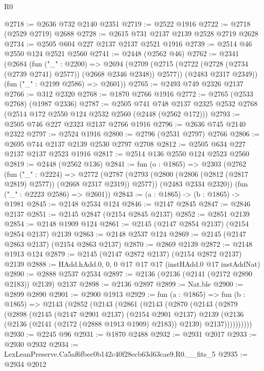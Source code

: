 \begin{lexlean}{R0}
\begin{coremodule}
@2718 := @2636 @732 @2140 @2351
@2719 := @2522 @1916
@2722 := @2718 (@2529 @2719) @2688
@2728 := @2615 @731 @2137 @2139 @2528 @2719 @2628
@2734 := @2505 @604 @227 @2137 @2137 @2521 @1916
@2739 := @2514 @46 @2550 @124 @2521 @2560
@2741 := @2448 (@2562 @46)
@2762 := @2341
    (@2684
      (fun ("_" : @2200) =>
      @2694
        (@2709 (@2715 (@2722 (@2728 (@2734 (@2739 @2741) @2577)) (@2668 @2346 @2348)) @2577))
        (@2483 @2317 @2349))
      (fun ("_" : @2199 @2586) => @2601))
@2765 := @2493 @749 @2326 @2137
@2766 := @312 @2320
@2768 := @1870 @2766 @1916
@2772 := @2765 (@2533 @2768) (@1987 @2336)
@2787 := @2505
    @741
    @748
    @2137
    @2325
    @2532
    @2768
    (@2514 @172 @2550 @124 @2532 @2560 (@2448 (@2562 @172)))
@2793 := @2505 @746 @227 @2323 @2137 @2766 @1916
@2796 := @2636 @745 @2140 @2322
@2797 := @2524 @1916
@2800 := @2796 (@2531 @2797) @2766
@2806 := @2695 @744 @2137 @2139 @2530 @2797 @2708
@2812 := @2505 @634 @227 @2137 @2137 @2523 @1916
@2817 := @2514 @136 @2550 @124 @2523 @2560
@2819 := @2448 (@2562 @136)
@2841 := fun (o : @1865) =>
  @2303
    (@2762
      (fun ("_" : @2224) =>
      @2772
        (@2787 (@2793 (@2800 (@2806 (@2812 (@2817 @2819) @2577)) (@2668 @2317 @2319)) @2577))
        (@2483 @2334 @2320))
      (fun ("_" : @2223 @2586) => @2601))
@2843 := (a : @1865) -> (b : @1865) -> @1981
@2845 := @2148 @2534 @124
@2846 := @2147 @2845
@2847 := @2846 @2137
@2851 := @2145 @2847 (@2154 @2845 @2137)
@2852 := @2851 @2139
@2854 := @2148 @1909 @124
@2861 := @2145 (@2147 @2854 @2137) (@2154 @2854 @2137) @2139
@2863 := @2148 @2537 @124
@2869 := @2145 (@2147 @2863 @2137) (@2154 @2863 @2137)
@2870 := @2869 @2139
@2872 := @2148 @1913 @124
@2879 := @2145 (@2147 @2872 @2137) (@2154 @2872 @2137) @2139
@2888 := HAdd.hAdd.{0, 0, 0} @17 @17 @17 (instHAdd.{0} @17 instAddNat)
@2890 := @2888 @2537 @2534
@2897 := @2136 (@2136 (@2141 (@2172 @2890 @2183)) @2139) @2137
@2898 := @2136 @2897
@2899 := Nat.ble
@2900 := @2899 @2890
@2901 := @2900 @1913
@2929 := fun (a : @1865) =>
  fun (b : @1865) =>
  @2143
    (@2852
      (@2143
        (@2861
          (@2143
            (@2870
              (@2143
                (@2879
                  (@2898
                    (@2145
                      (@2147 @2901 @2137)
                      (@2154 @2901 @2137)
                      @2139
                      (@2136 (@2136 (@2141 (@2172 (@2888 @1913 @1909) @2183)) @2139) @2137))))))))))
@2930 := @2245 @96
@2931 := @1870 @2488
@2932 := @2931 @2017
@2933 := @2930 @2932
@2934 := LexLeanPreserve.Ca5af6fbec0b142c40f28ecb63d63cae9.R0.__fits_5
@2935 := @2934 @2012

\end{coremodule}
\end{lexlean}
